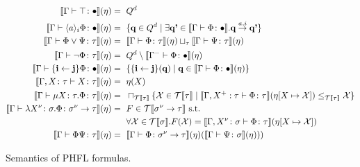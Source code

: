 \begin{figure}
    \caption{Semantics of PHFL formulas.}
    \label{figure:phfl-semantics}
    \begin{align*}
        \llbracket \Gamma \vdash \top \colon \bullet \rrbracket(\eta) =\text{ }& Q^d\\
        \llbracket \Gamma \vdash \langle a \rangle_i \Phi \colon \bullet \rrbracket(\eta) =\text{ }& \{\emph{q} \in Q^d \mid
        \exists \emph{q'} \in \llbracket \Gamma \vdash \Phi \colon \bullet \rrbracket . \emph{q}
        \overset{a, i}{\rightarrow} \emph{q'}\}\\
        \llbracket \Gamma \vdash \Phi \vee \Psi \colon \tau \rrbracket(\eta) =\text{ }& \llbracket \Gamma \vdash \Phi
        \colon \tau \rrbracket (\eta) \sqcup_\tau \llbracket \Gamma \vdash \Psi \colon \tau \rrbracket (\eta)\\
        \llbracket \Gamma \vdash \neg \Phi \colon \tau \rrbracket(\eta) =\text{ }& Q^d \setminus \llbracket \Gamma^- \vdash \Phi
        \colon \bullet \rrbracket (\eta)\\
        \llbracket \Gamma \vdash \{\emph{i} \leftarrow \emph{j}\} \Phi \colon \bullet \rrbracket(\eta) =\text{ }&
        \{\{\emph{i} \leftarrow \emph{j}\}(\emph{q}) \mid \emph{q} \in \llbracket \Gamma \vdash \Phi \colon \bullet
        \rrbracket (\eta)\}\\
        \llbracket \Gamma, X \colon \tau \vdash X \colon \tau \rrbracket(\eta) =\text{ }& \eta(X)\\
        \llbracket \Gamma \vdash \mu X \colon \tau .\Phi \colon \tau \rrbracket(\eta) =\text{ }&
        \sqcap_{\mathcal{T}\llbracket\tau\rrbracket} \{\mathcal{X} \in \mathcal{T}\llbracket \tau \rrbracket \mid
        \llbracket \Gamma, X^+ : \tau \vdash \Phi \colon \tau \rrbracket(\eta[X \mapsto \mathcal{X}])
        \leq_{\mathcal{T}\llbracket \tau \rrbracket} \mathcal{X}\}\\
        \llbracket \Gamma \vdash \lambda X^\nu \colon \sigma. \Phi \colon \sigma^\nu \rightarrow \tau \rrbracket
        (\eta) =\text{ }& F \in \mathcal{T}\llbracket \sigma^\nu \rightarrow \tau \rrbracket \text{ s.t. }\\
        &\forall \mathcal{X} \in
        \mathcal{T}\llbracket \sigma \rrbracket. F(\mathcal{X}) = \llbracket \Gamma, X^\nu \colon \sigma \vdash \Phi \colon \tau
        \rrbracket (\eta[X \mapsto \mathcal{X}])\\
        \llbracket \Gamma \vdash \Phi \Psi \colon \tau \rrbracket(\eta) =\text{ }& \llbracket \Gamma \vdash \Phi \colon \sigma
        ^\nu \rightarrow \tau \rrbracket (\eta)(\llbracket \Gamma \vdash \Psi \colon \sigma \rrbracket (\eta)))
    \end{align*}
\end{figure}


